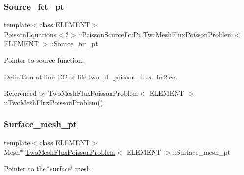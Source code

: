 \mbox{\label{classTwoMeshFluxPoissonProblem_a56a27b0dbf0f5975a4b9d37f3985c364}} 
\subsubsection{\texorpdfstring{Source\+\_\+fct\+\_\+pt}{Source\_fct\_pt}}
{\footnotesize\ttfamily template$<$class E\+L\+E\+M\+E\+NT$>$ \\
Poisson\+Equations$<$2$>$\+::Poisson\+Source\+Fct\+Pt \hyperlink{classTwoMeshFluxPoissonProblem}{Two\+Mesh\+Flux\+Poisson\+Problem}$<$ E\+L\+E\+M\+E\+NT $>$\+::Source\+\_\+fct\+\_\+pt\hspace{0.3cm}{\ttfamily [private]}}



Pointer to source function. 



Definition at line 132 of file two\+\_\+d\+\_\+poisson\+\_\+flux\+\_\+bc2.\+cc.



Referenced by Two\+Mesh\+Flux\+Poisson\+Problem$<$ E\+L\+E\+M\+E\+N\+T $>$\+::\+Two\+Mesh\+Flux\+Poisson\+Problem().

\mbox{\label{classTwoMeshFluxPoissonProblem_a96b1ff6102eceb5ce432ac9197f68283}} 
\subsubsection{\texorpdfstring{Surface\+\_\+mesh\+\_\+pt}{Surface\_mesh\_pt}}
{\footnotesize\ttfamily template$<$class E\+L\+E\+M\+E\+NT$>$ \\
Mesh$\ast$ \hyperlink{classTwoMeshFluxPoissonProblem}{Two\+Mesh\+Flux\+Poisson\+Problem}$<$ E\+L\+E\+M\+E\+NT $>$\+::Surface\+\_\+mesh\+\_\+pt\hspace{0.3cm}{\ttfamily [private]}}



Pointer to the \char`\"{}surface\char`\"{} mesh. 



